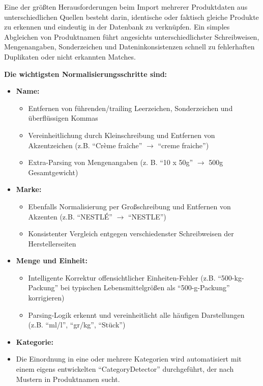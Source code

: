\documentclass[12pt, a4paper]{report} %
\begin{document}
Eine der größten Herausforderungen beim Import mehrerer Produktdaten aus unterschiedlichen Quellen besteht darin, identische oder faktisch gleiche Produkte zu erkennen und eindeutig in der Datenbank zu verknüpfen. Ein simples Abgleichen von Produktnamen führt angesichts unterschiedlichster Schreibweisen, Mengenangaben, Sonderzeichen und Dateninkonsistenzen schnell zu fehlerhaften Duplikaten oder nicht erkannten Matches.

\textbf{Die wichtigsten Normalisierungsschritte sind:}

\begin{itemize}
    \item \textbf{Name:}
      \begin{itemize}
        \item Entfernen von führenden/trailing Leerzeichen, Sonderzeichen und überflüssigen Kommas
        \item Vereinheitlichung durch Kleinschreibung und Entfernen von Akzentzeichen (z.B. "`Crème fraîche"' $\to$ "`creme fraiche"')
        \item Extra-Parsing von Mengenangaben (z. B. "`10 x 50g"' $\to$ 500g Gesamtgewicht)
      \end{itemize}
    \item \textbf{Marke:}
      \begin{itemize}
        \item Ebenfalls Normalisierung per Großschreibung und Entfernen von Akzenten (z.B. "`NESTLÉ"' $\to$ "`NESTLE"')
        \item Konsistenter Vergleich entgegen verschiedenster Schreibweisen der Herstellerseiten
      \end{itemize}
    \item \textbf{Menge und Einheit:}
      \begin{itemize}
        \item Intelligente Korrektur offensichtlicher Einheiten-Fehler (z.B. "`500-kg-Packung"' bei typischen Lebensmittelgrößen als "`500-g-Packung"' korrigieren)
        \item Parsing-Logik erkennt und vereinheitlicht alle häufigen Darstellungen (z.B. "`ml/l"', "`gr/kg"', "`Stück"')
      \end{itemize}
    \item \textbf{Kategorie:}
      \item Die Einordnung in eine oder mehrere Kategorien wird automatisiert mit einem eigens entwickelten "`CategoryDetector"' durchgeführt, der nach Mustern in Produktnamen sucht.
\end{itemize}
\end{document}
